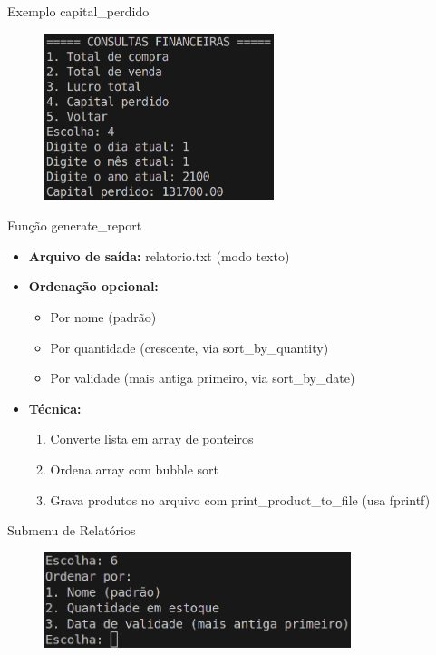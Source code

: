 \documentclass{beamer}
\begin{document}
\begin{frame}{Exemplo capital\_perdido}
    \begin{figure}
        \centering
        \includegraphics[width=0.6\textwidth]{img/capital-perdido.png}
    \end{figure}   
\end{frame}


\begin{frame}{Função generate\_report}
    \begin{itemize}
        \item \textbf{Arquivo de saída:} relatorio.txt (modo texto)
        \item \textbf{Ordenação opcional:}
        \begin{itemize}
            \item Por nome (padrão)
            \item Por quantidade (crescente, via sort\_by\_quantity)
            \item Por validade (mais antiga primeiro, via sort\_by\_date)
        \end{itemize}
        \item \textbf{Técnica:}
        \begin{enumerate}
            \item Converte lista em array de ponteiros
            \item Ordena array com bubble sort
            \item Grava produtos no arquivo com print\_product\_to\_file (usa fprintf)
        \end{enumerate}
    \end{itemize}
\end{frame}

\begin{frame}{Submenu de Relatórios}
    \begin{figure}
        \centering
        \includegraphics[width=0.8\textwidth]{img/submenu-relatorio.png}
    \end{figure}
\end{frame}
\end{document}

